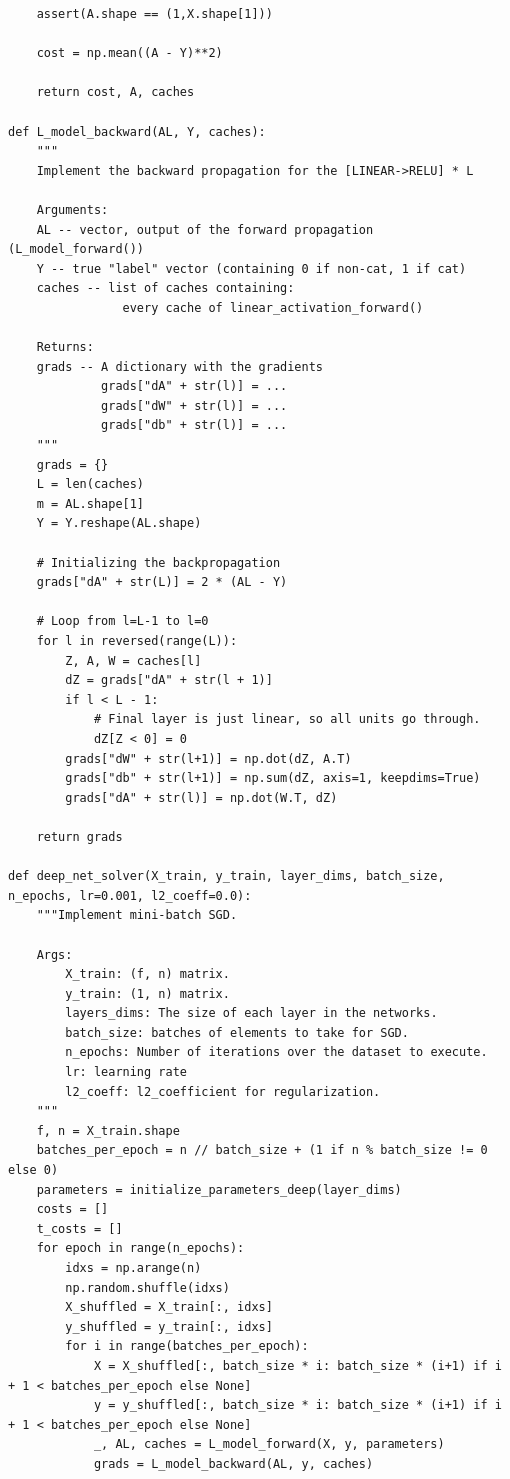 \documentclass[12pt]{article}
\begin{document}
\begin{enumerate}[label=(\alph*)]
\begin{verbatim}
    assert(A.shape == (1,X.shape[1]))
    
    cost = np.mean((A - Y)**2)
            
    return cost, A, caches

def L_model_backward(AL, Y, caches):
    """
    Implement the backward propagation for the [LINEAR->RELU] * L
    
    Arguments:
    AL -- vector, output of the forward propagation (L_model_forward())
    Y -- true "label" vector (containing 0 if non-cat, 1 if cat)
    caches -- list of caches containing:
                every cache of linear_activation_forward()
    
    Returns:
    grads -- A dictionary with the gradients
             grads["dA" + str(l)] = ... 
             grads["dW" + str(l)] = ...
             grads["db" + str(l)] = ... 
    """
    grads = {}
    L = len(caches)
    m = AL.shape[1]
    Y = Y.reshape(AL.shape)
    
    # Initializing the backpropagation
    grads["dA" + str(L)] = 2 * (AL - Y)
    
    # Loop from l=L-1 to l=0
    for l in reversed(range(L)):
        Z, A, W = caches[l]
        dZ = grads["dA" + str(l + 1)]
        if l < L - 1:
            # Final layer is just linear, so all units go through.
            dZ[Z < 0] = 0
        grads["dW" + str(l+1)] = np.dot(dZ, A.T)
        grads["db" + str(l+1)] = np.sum(dZ, axis=1, keepdims=True)
        grads["dA" + str(l)] = np.dot(W.T, dZ)

    return grads

def deep_net_solver(X_train, y_train, layer_dims, batch_size, n_epochs, lr=0.001, l2_coeff=0.0):
    """Implement mini-batch SGD.
    
    Args:
        X_train: (f, n) matrix.
        y_train: (1, n) matrix.
        layers_dims: The size of each layer in the networks. 
        batch_size: batches of elements to take for SGD.
        n_epochs: Number of iterations over the dataset to execute.
        lr: learning rate
        l2_coeff: l2_coefficient for regularization.
    """
    f, n = X_train.shape
    batches_per_epoch = n // batch_size + (1 if n % batch_size != 0 else 0)
    parameters = initialize_parameters_deep(layer_dims)
    costs = []
    t_costs = []
    for epoch in range(n_epochs):
        idxs = np.arange(n)
        np.random.shuffle(idxs)
        X_shuffled = X_train[:, idxs]
        y_shuffled = y_train[:, idxs]
        for i in range(batches_per_epoch):
            X = X_shuffled[:, batch_size * i: batch_size * (i+1) if i + 1 < batches_per_epoch else None]
            y = y_shuffled[:, batch_size * i: batch_size * (i+1) if i + 1 < batches_per_epoch else None]
            _, AL, caches = L_model_forward(X, y, parameters)
            grads = L_model_backward(AL, y, caches)
            

\end{verbatim}
\end{enumerate}
\end{document}
